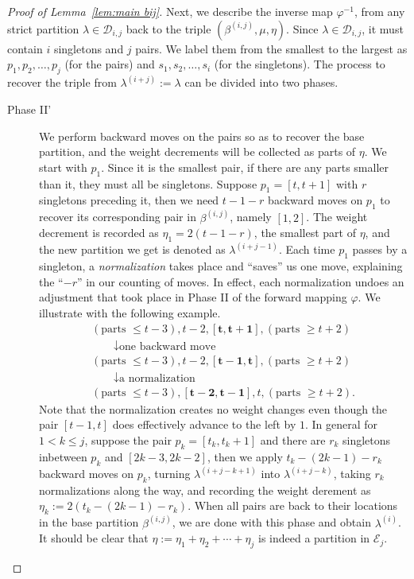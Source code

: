 \documentclass[11pt,reqno]{amsart}
\numberwithin{equation}{section}
\theoremstyle{plain}
\theoremstyle{definition}
\def\E{\mathcal{E}}
\def\la{\lambda}
\newcommand{\D}{\mathcal{D}}
\begin{document}
\begin{proof}[Proof of Lemma~\ref{lem:main bij}]
Next, we describe the inverse map $\varphi^{-1}$, from any strict partition $\la\in\D_{i,j}$ back to the triple $(\beta^{(i,j)},\mu,\eta)$. Since $\la\in\D_{i,j}$, it must contain $i$ singletons and $j$ pairs. We label them from the smallest to the largest as $p_1,p_2,\ldots,p_j$ (for the pairs) and $s_1,s_2,\ldots,s_i$ (for the singletons). The process to recover the triple from $\la^{(i+j)}:=\la$ can be divided into two phases.
\begin{description}
  \item[Phase II'] We perform backward moves on the pairs so as to recover the base partition, and the weight decrements will be collected as parts of $\eta$. We start with $p_1$. Since it is the smallest pair, if there are any parts smaller than it, they must all be singletons. Suppose $p_1=[t,t+1]$ with $r$ singletons preceding it, then we need $t-1-r$ backward moves on $p_1$ to recover its corresponding pair in $\beta^{(i,j)}$, namely $[1,2]$. The weight decrement is recorded as $\eta_1=2(t-1-r)$, the smallest part of $\eta$, and the new partition we get is denoted as $\la^{(i+j-1)}$. Each time $p_1$ passes by a singleton, a {\it normalization} takes place and ``saves'' us one move, explaining the ``$-r$'' in our counting of moves. In effect, each normalization undoes an adjustment that took place in Phase II of the forward mapping $\varphi$. We illustrate with the following example.
  $$
  \begin{gathered}
  (\text{parts $\leq t-3$}), t-2, [ \mathbf{t}, \mathbf{t+1}], (\text{parts $\geq t+2$}) \\
  \qquad \downarrow \text {one backward move } \\
  (\text{parts $\leq t-3$}), t-2, [\mathbf{t-1}, \mathbf{t}], (\text{parts $\geq t+2$})\\
  \qquad \downarrow \text {a normalization } \\
  (\text{parts $\leq t-3$}), [\mathbf{t-2}, \mathbf{t-1}], t, (\text{parts $\geq t+2$}).
  \end{gathered}
  $$
  Note that the normalization creates no weight changes even though the pair $[t-1,t]$ does effectively advance to the left by $1$. In general for $1< k\le j$, suppose the pair $p_k=[t_k,t_k+1]$ and there are $r_k$ singletons inbetween $p_k$ and $[2k-3,2k-2]$, then we apply $t_k-(2k-1)-r_k$ backward moves on $p_k$, turning $\la^{(i+j-k+1)}$ into $\la^{(i+j-k)}$, taking $r_k$ normalizations along the way, and recording the weight derement as $\eta_k:=2(t_k-(2k-1)-r_k)$. When all pairs are back to their locations in the base partition $\beta^{(i,j)}$, we are done with this phase and obtain $\la^{(i)}$. It should be clear that $\eta:=\eta_1+\eta_2+\cdots+\eta_j$ is indeed a partition in $\E_j$.

\end{description}
\end{proof}
\end{document}
